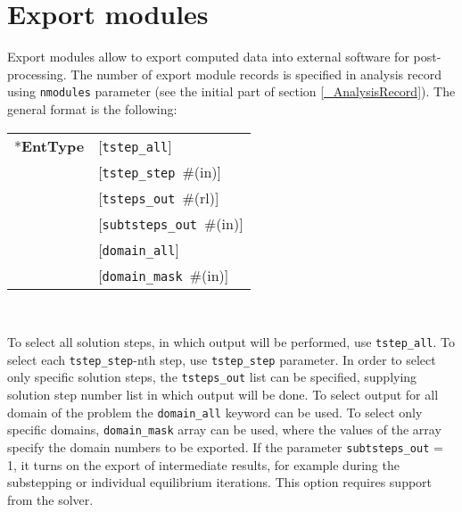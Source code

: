 \documentclass[a4paper]{report}
\newcommand{\param}[1]{\texttt{#1}} %
\newcommand{\optional}[1]{[#1]} %
\newcommand{\field}[2]{\param{#1}~\#{\tiny(#2)}} %
\newcommand{\optField}[2]{\optional{\field{#1}{#2}}}
\newcommand{\fieldnotype}[1]{\param{#1}}
\newcommand{\entKeyword}[1]{*\textbf{#1}} %
\newenvironment{record}[1][]{\begin{tabular}{|ll}}{\end{tabular}\\}
\newcommand{\recentry}[2]{{#1}&{#2}\\}
\newcounter{rcc}
\newenvironment{record}[1][\textwidth]{\setcounter{rcc}{0}\rowcolors{1}{lightgray}{lightgray}\tabularx{#1}{llR} \hline}
               {\endtabularx}
\newcommand{\recentry}[2]{\ifthenelse{\value{rcc}>0}{$\backslash$ \\}{\setcounter{rcc}{1}}{#1}&{#2}&}
\begin{document}
\section{Export modules}
\label{ExportModulesSec}
Export modules allow to export computed data into external software for
post-processing. The number of export module records is specified in
analysis record using \param{nmodules} parameter (see the initial part of section \ref{_AnalysisRecord}). The general format
is the following:\\
\begin{record}
  \recentry{\entKeyword{EntType}}{[\fieldnotype{tstep\_all}]}
  \recentry{}{\optField{tstep\_step}{in}}
  \recentry{}{\optField{tsteps\_out}{rl}}
  \recentry{}{\optField{subtsteps\_out}{in}}
  \recentry{}{[\fieldnotype{domain\_all}]}
  \recentry{}{\optField{domain\_mask}{in}}
\end{record}

To select all solution steps, in which output will be performed, use
\param{tstep\_all}. To select each \param{tstep\_step}-nth step, use
\param{tstep\_step} parameter. In order to select only specific
solution steps, the \param{tsteps\_out} list can be specified,
supplying solution step number list in which output will be done.
To select output for all domain of the problem the \param{domain\_all}
keyword can be used. To select only specific domains,
\param{domain\_mask} array can be used, where the values of the array
specify the domain numbers to be exported.
If the parameter \param{subtsteps\_out} = 1, it turns on the export of intermediate results, 
for example during the substepping or individual equilibrium iterations. This option requires support from the solver.
\end{document}
